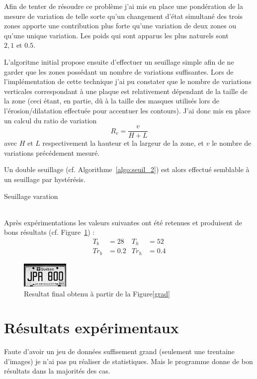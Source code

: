 \documentclass[a4paper,10pt,twocolumn]{article}
\begin{document}
Afin de tenter de résoudre ce problème j'ai mis en place une pondération de la mesure de variation de telle sorte qu'un changement d'état simultané des trois zones apporte une contribution plus forte qu'une variation de deux zones ou qu'une unique variation. Les poids qui sont apparus les plus naturels sont $2, 1 \text{ et } 0.5$.

L'algoritme initial propose ensuite d'effectuer un seuillage simple afin de ne garder que les zones possédant un nombre de variations suffisantes. Lors de l'implémentation de cette technique j'ai pu constater que le nombre de variations verticales correspondant à une plaque est relativement dépendant de la taille de la zone (ceci étant, en partie, dû à la taille des masques utilisés lors de l'érosion/dilatation effectuée pour accentuer les contours). J'ai donc mis en place un calcul du ratio de variation
\begin{equation}
  R_v = \frac{v}{H+L}
\end{equation}
avec $H \text{ et } L$ respectivement la hauteur et la largeur de la zone, et $v$ le nombre de variations précédement mesuré.

Un double seuillage (cf. Algorithme~\ref{algo:seuil_2}) est alors effectué semblable à un seuillage par hystérésis.
\begin{algorithm} 
	\caption{Seuillage varation\label{algo:seuil_2}}
	
\end{algorithm}\\
Après expérimentations les valeurs suivantes ont été retenues et produisent de bons résultats (cf. Figure~\ref{plate}) :
\begin{align*}
  T_b &= 28 &T_h &= 52\\
  Tr_b &= 0.2 &Tr_h &= 0.4
\end{align*}
\begin{figure}[H]
	\centering 
	  \includegraphics{img/plate.png}
	\caption{Resultat final obtenu à partir de la Figure\ref{grad}\label{plate}}
\end{figure}

\section{Résultats expérimentaux}
Faute d'avoir un jeu de données suffisement grand (seulement une trentaine d'images) je n'ai pas pu réaliser de statistiques. Mais le programme donne de bon résultats dans la majorités des cas.
\end{document}
